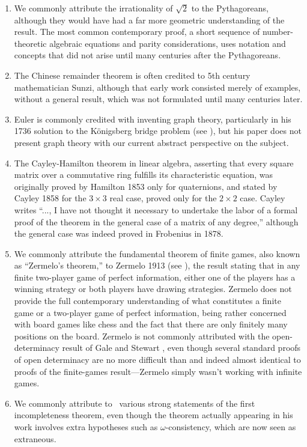 \documentclass{amsart}
\begin{document}
\begin{enumerate}
\item We commonly attribute the irrationality of $\sqrt{2}$ to the Pythagoreans, although they would have had a far more geometric understanding of the result. The most common contemporary proof, a short sequence of number-theoretic algebraic equations and parity considerations, uses notation and concepts that did not arise until many centuries after the Pythagoreans.

\item The Chinese remainder theorem is often credited to 5th century mathematician Sunzi, although that early work consisted merely of examples, without a general result, which was not formulated until many centuries later. 

\item Euler is commonly credited with inventing graph theory, particularly in his 1736 solution to the K\"onigsberg bridge problem (see \cite{BiggsLloydWilson1986:Graph-theory-1736-1936}), but his paper does not present graph theory with our current abstract perspective on the subject. 

\item The Cayley-Hamilton theorem in linear algebra, asserting that every square matrix over a commutative ring fulfills its characteristic equation, was originally proved by Hamilton 1853 only for quaternions, and stated by Cayley 1858 for the $3\times 3$ real case, proved only for the $2\times 2$ case. Cayley \cite{Cayley1858:A-memoir-on-the-theory-of-matrices} writes “..., I have not thought it necessary to undertake the labor of a formal proof of the theorem in the general case of a matrix of any degree,” although the general case was indeed proved in Frobenius in 1878. 

\item We commonly attribute the fundamental theorem of finite games, also known as ``Zermelo's theorem,'' to Zermelo 1913 (see \cite{Larson2010:Zermelo-1913}), the result stating that in any finite two-player game of perfect information, either one of the players has a winning strategy or both players have drawing strategies. Zermelo does not provide the full contemporary understanding of what constitutes a finite game or a two-player game of perfect information, being rather concerned with board games like chess and the fact that there are only finitely many positions on the board. Zermelo is not commonly attributed with the open-determinacy result of Gale and Stewart \cite{GaleStewart1953:InfiniteGamesWithPerfectInformation}, even though several standard proofs of open determinacy are no more difficult than and indeed almost identical to proofs of the finite-games result---Zermelo simply wasn't working with infinite games. 

\item We commonly attribute to \Godel\ various strong statements of the first incompleteness theorem, even though the theorem actually appearing in his work involves extra hypotheses such as $\omega$-consistency, which are now seen as extraneous.

\end{enumerate}
\end{document}
